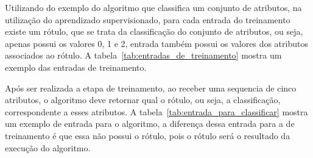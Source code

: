Utilizando do exemplo do algoritmo que classifica um conjunto de atributos,
na utilização do aprendizado supervisionado, para cada entrada do treinamento
existe um rótulo, que se trata da classificação do conjunto de atributos, ou
seja, apenas possui os valores 0, 1 e 2, entrada também possui os valores dos
atributos associados ao rótulo. A tabela~\ref{tab:entradas_de_treinamento}
mostra um exemplo das entradas de treinamento.

\begin{table}[h]
\centering
{}
\caption{Entradas de treinamento para o aprendizado de máquina}
\label{tab:entradas_de_treinamento}
\end{table}

Após ser realizada a etapa de treinamento, ao receber uma sequencia de cinco
atributos, o algoritmo deve retornar qual o rótulo, ou seja, a classificação,
correspondente a esses atributos. A tabela~\ref{tab:entrada_para_classificar}
mostra um exemplo de entrada para o algoritmo, a diferença dessa entrada para
a de treinamento é que essa não possui o rótulo, pois o rótulo será o resultado
da execução do algoritmo.

\begin{table}[h]
\centering
{}
\caption{Entrada de dados para o algoritmo determinar o rótulo}
\label{tab:entrada_para_classificar}
\end{table}

